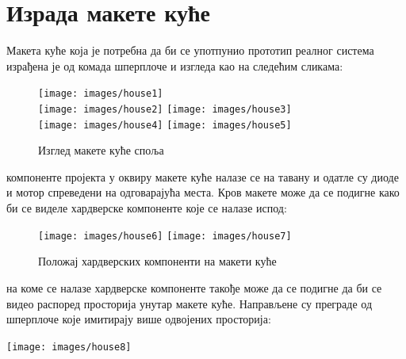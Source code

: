 \documentclass[12pt]{article}
\begin{document}
\newpage
\section{Израда макете куће}
Макета куће која је потребна да би се употпунио прототип реалног система израђена је од комада шперплоче и изгледа као на следећим сликама:
\begin{figure}[H]
\centering
\texttt{[image: images/house1]}
\vspace{0.5cm}\\
\texttt{[image: images/house2]}
\hfill %
\texttt{[image: images/house3]}
\vspace{0.5cm}\\
\texttt{[image: images/house4]}
\hfill %
\texttt{[image: images/house5]}
\caption{Изглед макете куће споља}
\end{figure}
 компоненте пројекта у оквиру макете куће налазе се на тавану и одатле су диоде и мотор спреведени на одговарајућа места. Кров макете може да се подигне како би се виделе хардверске компоненте које се налазе испод:
\begin{figure}[H]
\centering
\texttt{[image: images/house6]}
\hfill %
\texttt{[image: images/house7]}
\caption{Положај хардверских компоненти на макети куће}
\end{figure}
\vspace{0.5cm}
 на коме се налазе хардверске компоненте такође може да се подигне да би се видео распоред просторија унутар макете куће. Направљене су преграде од шперплоче које имитирају више одвојених просторија: 
\vspace{0.2cm}
\begin{center}
    \centering 
    \texttt{[image: images/house8]}
\end{center}


\newpage
\end{document}
